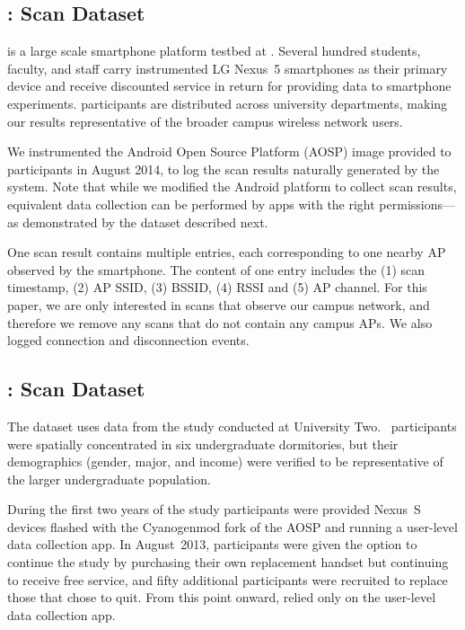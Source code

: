 \subsection{\ubscan{}: \PhoneLab{} \wifi{} Scan Dataset}
\label{sec:phonelab}

\PhoneLab{} is a large scale smartphone platform testbed at \ub{}. Several hundred students,
faculty, and staff carry instrumented LG Nexus~5 smartphones as their primary
device and receive discounted service in return for providing data to smartphone
experiments. \PhoneLab{} participants are distributed across university
departments, making our results representative of the broader campus wireless
network users.

We instrumented the \PhoneLab{} Android Open Source Platform (AOSP)
image provided to participants in August 2014, to log the \wifi{} scan
results naturally generated by the system. Note that while we modified the Android platform to
collect scan results, equivalent data collection can be performed by apps
with the right permissions---as demonstrated by the \ndscan{} dataset described
next.

One scan result contains multiple entries, each corresponding to one nearby
\wifi{} AP observed by the smartphone. The content of one entry includes the
(1) scan timestamp, (2) AP SSID, (3) BSSID, (4) RSSI and (5) AP channel. For
this paper, we are only interested in \wifi{} scans that observe our campus
network, and therefore we remove any scans that do not contain any campus
APs. We also logged \wifi{} connection and disconnection events.


\subsection{\ndscan{}: \NetSense{} \wifi{} Scan Dataset}
\label{sec:netsense}

The \ndscan{} dataset uses data from the \NetSense{} study
conducted at University Two.
\NetSense{}~participants were spatially concentrated in six undergraduate
dormitories, but their demographics (gender, major, and income) were verified
to be representative of the larger undergraduate population.

During the first two years of the study \NetSense{} participants were
provided Nexus~S devices flashed with the Cyanogenmod fork of the AOSP and
running a user-level data collection app. In August~2013, participants were
given the option to continue the study by purchasing their own replacement
handset but continuing to receive free service, and fifty additional
participants were recruited to replace those that chose to quit. From this
point onward, \NetSense{} relied only on the user-level data collection app.

